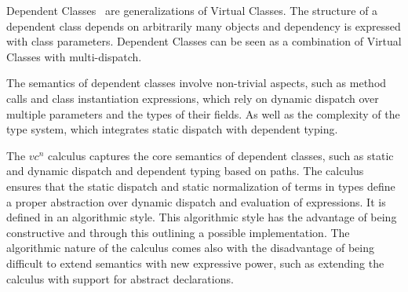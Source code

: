 Dependent Classes~\cite{dc,vaidas:thesis} are generalizations of Virtual Classes.
The structure of a dependent class depends on arbitrarily many objects and
dependency is expressed with class parameters.
Dependent Classes can be seen as a combination of Virtual Classes with multi-dispatch.

The semantics of dependent classes involve non-trivial aspects,
such as method calls and class instantiation expressions,
which rely on dynamic dispatch over multiple parameters and the types of their fields.
As well as the complexity of the type system,
which integrates static dispatch with dependent typing.

The $vc^n$ calculus captures the core semantics of dependent classes,
such as static and dynamic dispatch and dependent typing based on paths.
The calculus ensures that the static dispatch and static normalization of terms in types
define a proper abstraction over dynamic dispatch and evaluation of expressions.
It is defined in an algorithmic style.
This algorithmic style has the advantage of being constructive
and through this outlining a possible implementation.
The algorithmic nature of the calculus comes also with the disadvantage
of being difficult to extend semantics with new expressive power,
such as extending the calculus with support for abstract declarations.



